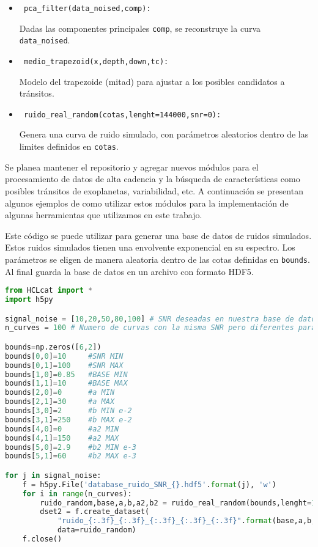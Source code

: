 \begin{itemize}
	\item \begin{verbatim} pca_filter(data_noised,comp): \end{verbatim} Dadas las componentes principales \texttt{comp}, se reconstruye la curva \texttt{data\_noised}.
	\item \begin{verbatim} medio_trapezoid(x,depth,down,tc): \end{verbatim} Modelo del trapezoide (mitad) para ajustar a los posibles candidatos a tránsitos.
	\item \begin{verbatim} ruido_real_random(cotas,lenght=144000,snr=0): \end{verbatim} Genera una curva de ruido simulado, con parámetros aleatorios dentro de las limites definidos en \texttt{cotas}.
\end{itemize}

Se planea mantener el repositorio y agregar nuevos módulos para el procesamiento de datos de alta cadencia y la búsqueda de características como posibles tránsitos de exoplanetas, variabilidad, etc. A continuación se presentan algunos ejemplos de como utilizar estos módulos para la implementación de algunas herramientas que utilizamos en este trabajo.

\newpage

Este código se puede utilizar para generar una base de datos de ruidos simulados. Estos ruidos simulados tienen una envolvente exponencial en su espectro. Los parámetros se eligen de manera aleatoria dentro de las cotas definidas en \texttt{bounds}. Al final guarda la base de datos en un archivo con formato HDF5.

\begin{lstlisting}[language=Python]
from HCLcat import *
import h5py

signal_noise = [10,20,50,80,100] # SNR deseadas en nuestra base de datos
n_curves = 100 # Numero de curvas con la misma SNR pero diferentes parametros

bounds=np.zeros([6,2])
bounds[0,0]=10     #SNR MIN
bounds[0,1]=100    #SNR MAX
bounds[1,0]=0.85   #BASE MIN
bounds[1,1]=10     #BASE MAX
bounds[2,0]=0      #a MIN
bounds[2,1]=30     #a MAX
bounds[3,0]=2      #b MIN e-2
bounds[3,1]=250    #b MAX e-2         
bounds[4,0]=0      #a2 MIN
bounds[4,1]=150    #a2 MAX
bounds[5,0]=2.9    #b2 MIN e-3
bounds[5,1]=60     #b2 MAX e-3

for j in signal_noise:
    f = h5py.File('database_ruido_SNR_{}.hdf5'.format(j), 'w')
    for i in range(n_curves):
        ruido_random,base,a,b,a2,b2 = ruido_real_random(bounds,lenght=144000,snr=j)
        dset2 = f.create_dataset(
			"ruido_{:.3f}_{:.3f}_{:.3f}_{:.3f}_{:.3f}".format(base,a,b,a2,b2),
			data=ruido_random)
    f.close()

\end{lstlisting}

